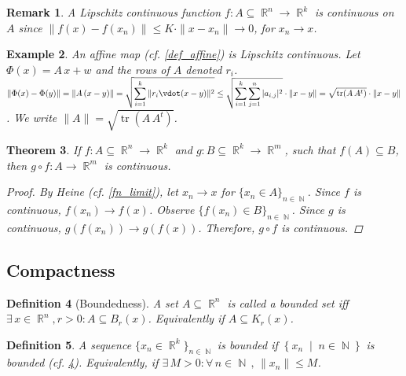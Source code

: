 \documentclass[12pt]{article}
\newcommand{\set}[2]{\left\{{#1}\;\middle|\;{#2}\right\}}
\newcommand{\Forall}[1]{\forall\,{#1}\,,\,}
\newcommand{\Exist}[1]{\exists\,{#1}:}
\DeclareMathOperator{\R}{\mathbb{R}}
\DeclareMathOperator{\N}{\mathbb{N}}
\newcommand{\seq}[2]{\{{#1}\}_{#2\in\N}}
\newtheorem{theorem}{Theorem}[subsection]
\newtheorem{definition}[theorem]{Definition}
\newtheorem{example}[theorem]{Example}
\newtheorem{remark}[theorem]{Remark}
\begin{document}
\begin{remark}
  A Lipschitz continuous function $f:A\subseteq\R^n\to\R^k$ is continuous on $A$ since $\|f(x)-f(x_n)\|\leq K\cdot\|x-x_n\|\to 0$, for $x_n\to x$.
\end{remark}

\begin{example}
  \label{cont_affine}
  An affine map (cf. \ref{def_affine}) is Lipschitz continuous. Let $\Phi(x)=A\,x+w$ and the rows of $A$ denoted $r_i$. $\displaystyle\|\Phi(x)-\Phi(y)\|=\|A\,(x-y)\|=\sqrt{\sum_{i=1}^k \|r_i\vdot(x-y)\|^2}\leq\sqrt{\sum_{i=1}^k\sum_{j=1}^n |a_{i,j}|^2}\cdot \|x-y\|=\sqrt{\operatorname{tr}(A\,A^t)}\cdot \|x-y\|$. We write $\|A\|=\sqrt{\operatorname{tr}(A\,A^t)}$.
\end{example}

\begin{theorem}
  \label{composition}
  If $f:A\subseteq \R^n\to \R^k$ and $g: B\subseteq \R^k\to\R^m$, such that $f(A)\subseteq B$, then $g\circ f:A\to\R^m$ is continuous.
  \begin{proof}
    By Heine (cf. \ref{fn_limit}), let $x_n\to x$ for $\seq{x_n\in A}{n}$. Since $f$ is continuous, $f(x_n)\to f(x)$. Observe $\seq{f(x_n)\in B}{n}$. Since $g$ is continuous, $g(f(x_n))\to g(f(x))$. Therefore, $g\circ f$ is continuous.
  \end{proof}
\end{theorem}


\pagebreak

\subsection{Compactness}

\begin{definition}[Boundedness]
  \label{def_bounded}
  A set $A\subseteq \R^n$ is called a bounded set iff $\Exist{x\in \R^n,r>0}A\subseteq B_r(x)$. Equivalently if  $A\subseteq K_r(x)$.
\end{definition}

\begin{definition}
  \label{seq_bdd}
  A sequence $\seq{x_n\in \R^k}{n}$ is bounded if $\set{x_n}{n\in\N}$ is bounded (cf. \ref{def_bounded}). Equivalently, if $\Exist{M>0}\Forall{n\in\N}\|x_n\|\leq M$.
\end{definition}
\end{document}

